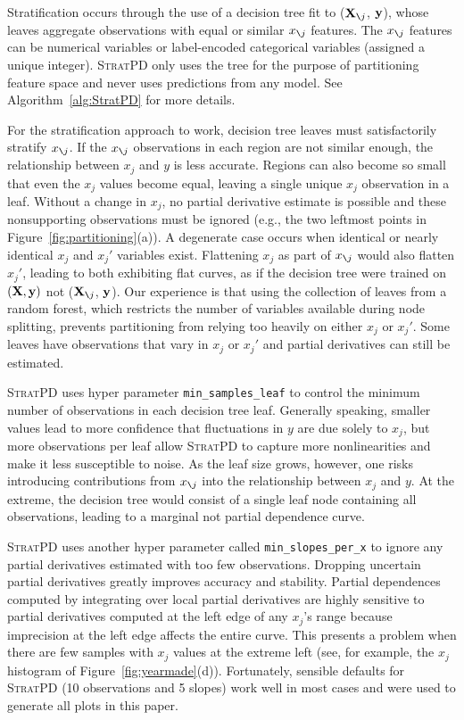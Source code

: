 \documentclass[smallextended]{svjour3}       %
\newcommand{\figref}[1]{Figure~\ref{#1}}
\newcommand{\algref}[1]{Algorithm~\ref{#1}}
\newcommand{\spd}{\fontfamily{cmr}\textsc{\small StratPD}}
\newcommand{\Xnj}{${\bf X}_{\texttt{\char`\\} j}$}
\newcommand{\xnj}{$x_{\texttt{\char`\\} j}$}
\begin{document}
Stratification occurs through the use of a decision tree fit to (\Xnj, $\bf y$), whose leaves aggregate observations with equal or similar \xnj{} features. The \xnj{} features can be numerical variables or label-encoded categorical variables (assigned a unique integer). \spd{} only uses the tree for the purpose of partitioning feature space and never uses predictions from any model. See \algref{alg:StratPD} for more details.

For the stratification approach to work, decision tree leaves must satisfactorily stratify \xnj{}. If the \xnj{} observations in each region are not similar enough, the relationship between $x_j$ and $y$   is less accurate.  Regions can also become so small that even the $x_j$ values become equal, leaving a single unique $x_j$ observation in a leaf. Without a change in $x_j$, no partial derivative estimate is possible and these nonsupporting observations must be  ignored (e.g., the two leftmost points in \figref{fig:partitioning}(a)). A degenerate case occurs when identical or nearly identical $x_j$ and $x_j'$ variables exist. Flattening $x_j$ as part of \xnj{} would also flatten $x_j'$, leading to both exhibiting flat curves, as if the decision tree were trained on $(\bf X, y)$ not (\Xnj, $\bf y$). Our experience is that using the collection of leaves from a random forest, which restricts the number of variables available during node splitting, prevents partitioning from relying too heavily on either $x_j$ or $x_j'$. Some leaves have observations that vary in $x_j$ or $x_j'$ and partial derivatives can still be estimated.

\spd{} uses hyper parameter {\tt\small min\_samples\_leaf} to control the minimum number of observations in each decision tree leaf.  Generally speaking, smaller values lead to more confidence that fluctuations in $y$ are due solely to $x_j$, but more observations per leaf allow \spd{} to capture more nonlinearities and make it less susceptible to noise.  As the leaf size grows, however, one risks introducing contributions from \xnj{} into the relationship between $x_j$ and $y$. At the extreme, the decision tree would consist of a single leaf node containing all observations, leading to a marginal not partial dependence curve.

\spd{} uses another hyper parameter called {\tt\small min\_slopes\_per\_x} to ignore any partial derivatives estimated with too few observations.  Dropping uncertain partial derivatives greatly improves accuracy and stability. Partial dependences computed by integrating over local partial derivatives are highly sensitive to partial derivatives computed at the left edge of any $x_j$'s range because imprecision at the left edge affects the entire curve.  This presents a problem when there are few samples with $x_j$ values at the extreme left (see, for example, the $x_j$ histogram of \figref{fig:yearmade}(d)).  Fortunately, sensible defaults for \spd{} (10 observations and 5 slopes) work well in most cases and  were used to generate all plots in this paper.
\end{document}
